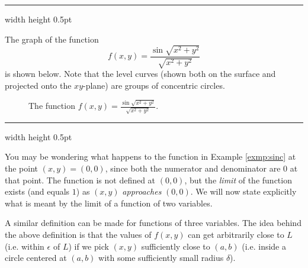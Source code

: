 \vspace{4mm}
\hrule width \textwidth height 0.5pt
\begin{exmp}\label{exmp:sinc}
 The graph of the function
 \begin{displaymath}
  f(x,y) = \dfrac{\sin \sqrt{x^2 + y^2}}{\sqrt{x^2 + y^2}}
 \end{displaymath}
 is shown below. Note that the level curves (shown both on the surface and projected onto the $xy$-plane) are groups
 of concentric circles.\vspace{-20mm}
 \begin{figure}[h]
 \begin{center}
  
 \end{center}\vspace{-12mm}
 \caption[]{\quad The function $f(x,y) = \frac{\sin \sqrt{x^2 + y^2}}{\sqrt{x^2 + y^2}}$.}
 \label{fig:sinc}
\end{figure}
\end{exmp}\vspace{-4mm}
\hrule width \textwidth height 0.5pt
\vspace{4mm}

You may be wondering what happens to the function in Example \ref{exmp:sinc} at the point $(x,y) = (0,0)$, since both
the numerator and denominator are $0$ at that point. The function is not defined at $(0,0)$, but the
\emph{limit} of the function exists (and equals $1$) as $(x,y)$ \emph{approaches} $(0,0)$. We will now state explicitly
what is meant by the limit of a function of two variables.
\newpage
{}

A similar definition can be made for functions of three variables.
The idea behind the above definition is that the values of $f(x,y)$ can get arbitrarily close to $L$ (i.e. within $\epsilon$ of $L$) 
if we pick $(x,y)$ sufficiently close to $(a,b)$ (i.e. inside a circle centered at
$(a,b)$ with some sufficiently small radius $\delta$).

